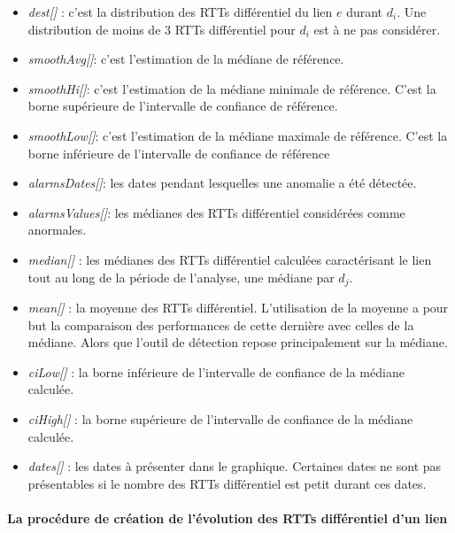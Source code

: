 \begin{itemize}
    \item \textit{dest[]} : c'est la distribution  des RTTs différentiel du lien $e$ durant $d_i$. Une distribution   de moins de $3$ RTTs différentiel pour $d_i$ est à ne pas considérer.
	
	\item \textit{smoothAvg[]}: c'est l'estimation de la médiane de référence. 
	
	\item \textit{smoothHi[]}: c'est l'estimation de la médiane minimale de référence. C'est la borne supérieure de l'intervalle de confiance de référence. 
	
	\item \textit{smoothLow[]}: c'est l'estimation de la médiane maximale de référence. C'est la borne inférieure de l'intervalle de confiance de référence 
	
	\item  \textit{alarmsDates[]}: les dates pendant lesquelles une anomalie a été détectée. 
	
	\item \textit{alarmsValues[]}: les médianes des RTTs différentiel considérées comme  anormales. 
	
	\item \textit{median[]} : les médianes des RTTs différentiel calculées caractérisant le lien tout au long de la période de l'analyse, une médiane par $d_j$.
	
	\item \textit{mean[]} : la moyenne des RTTs différentiel. L'utilisation de la moyenne a pour but la comparaison des performances de cette dernière avec celles de la médiane. Alors que l'outil de détection repose principalement sur la médiane.
	
	\item \textit{ciLow[]} : la borne inférieure de l'intervalle de confiance de la médiane calculée.
	
	\item \textit{ciHigh[]} : la borne supérieure de l'intervalle de confiance de la médiane calculée.
	
	\item \textit{dates[]} : les dates à présenter dans le graphique. Certaines dates ne sont pas présentables si le nombre des RTTs différentiel est petit durant ces dates.
	
\end{itemize}

\paragraph{La procédure de création de l'évolution des RTTs différentiel d'un lien }


